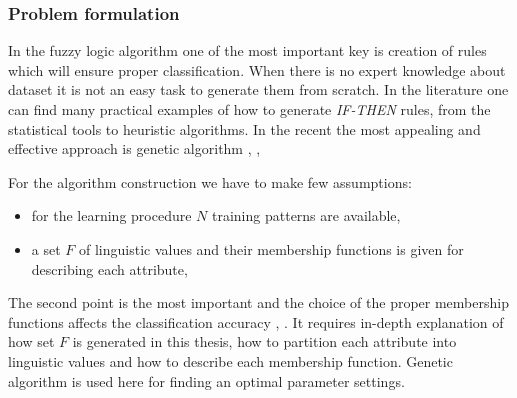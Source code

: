 \subsubsection{Problem formulation}
\label{cha:Fuzzy_logic_basic_problem_formulation}
In the fuzzy logic algorithm one of the most important key is creation of rules
which will ensure proper classification. When there is no expert knowledge about
dataset it is not an easy task to generate them from scratch. In the literature
one can find many practical examples of how to generate \textit{IF-THEN} rules, from
the statistical tools to heuristic algorithms. In the recent the most appealing
and effective approach is genetic algorithm \cite{bib4}, \cite{bib13}, \cite{bib23}

For the algorithm construction we have to make few assumptions:
\begin{itemize}
    \item for the learning procedure $N$ training patterns are available,
    \item a set $F$ of linguistic values and their membership functions is given
        for describing each attribute,
\end{itemize}
The second point is the most important and the choice of the proper membership
functions affects the classification accuracy \cite{bib17}, \cite{bib6}. It requires in-depth explanation
of how set $F$ is generated in this thesis, how to partition each attribute into 
linguistic values and how to describe each membership function. Genetic
algorithm is used here for finding an optimal parameter settings. 

